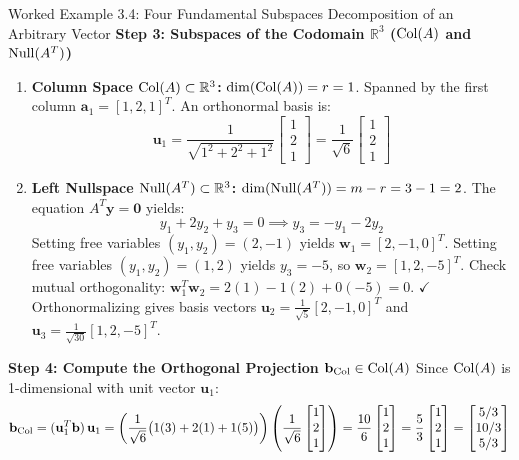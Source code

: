 \begin{examplebox}{Worked Example 3.4: Four Fundamental Subspaces Decomposition of an Arbitrary Vector}
\textbf{Step 3: Subspaces of the Codomain $\mathbb{R}^3$ ($\operatorname{Col}(A)$ and $\operatorname{Null}(A^T)$)}
\begin{enumerate}
    \item \textbf{Column Space $\operatorname{Col}(A) \subset \mathbb{R}^3$:}
    $\dim(\operatorname{Col}(A)) = r = 1$. Spanned by the first column $\mathbf{a}_1 = [1, 2, 1]^T$. An orthonormal basis is:
    \begin{equation*}
    \mathbf{u}_1 = \frac{1}{\sqrt{1^2 + 2^2 + 1^2}} \begin{bmatrix} 1 \\ 2 \\ 1 \end{bmatrix} = \frac{1}{\sqrt{6}} \begin{bmatrix} 1 \\ 2 \\ 1 \end{bmatrix}
    \end{equation*}
    \item \textbf{Left Nullspace $\operatorname{Null}(A^T) \subset \mathbb{R}^3$:}
    $\dim(\operatorname{Null}(A^T)) = m - r = 3 - 1 = 2$.
    The equation $A^T \mathbf{y} = \mathbf{0}$ yields:
    \begin{equation*}
    y_1 + 2y_2 + y_3 = 0 \implies y_3 = -y_1 - 2y_2
    \end{equation*}
    Setting free variables $(y_1, y_2) = (2, -1)$ yields $\mathbf{w}_1 = [2, -1, 0]^T$.
    Setting free variables $(y_1, y_2) = (1, 2)$ yields $y_3 = -5$, so $\mathbf{w}_2 = [1, 2, -5]^T$.
    Check mutual orthogonality: $\mathbf{w}_1^T \mathbf{w}_2 = 2(1) - 1(2) + 0(-5) = 0$. $\checkmark$
    Orthonormalizing gives basis vectors $\mathbf{u}_2 = \frac{1}{\sqrt{5}}[2, -1, 0]^T$ and $\mathbf{u}_3 = \frac{1}{\sqrt{30}}[1, 2, -5]^T$.
\end{enumerate}

\textbf{Step 4: Compute the Orthogonal Projection $\mathbf{b}_{\operatorname{Col}} \in \operatorname{Col}(A)$}
Since $\operatorname{Col}(A)$ is 1-dimensional with unit vector $\mathbf{u}_1$:
\begin{equation*}
\mathbf{b}_{\operatorname{Col}} = (\mathbf{u}_1^T \mathbf{b})\, \mathbf{u}_1 = \left( \frac{1}{\sqrt{6}} \big( 1(3) + 2(1) + 1(5) \big) \right) \left( \frac{1}{\sqrt{6}} \begin{bmatrix} 1 \\ 2 \\ 1 \end{bmatrix} \right) = \frac{10}{6} \begin{bmatrix} 1 \\ 2 \\ 1 \end{bmatrix} = \frac{5}{3} \begin{bmatrix} 1 \\ 2 \\ 1 \end{bmatrix} = \begin{bmatrix} 5/3 \\ 10/3 \\ 5/3 \end{bmatrix}
\end{equation*}


\end{examplebox}
